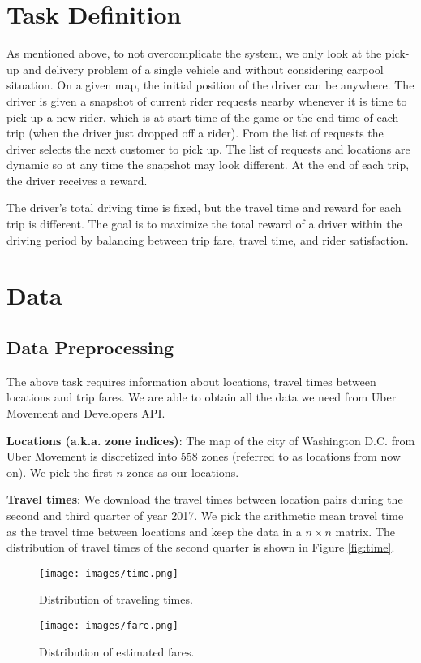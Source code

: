 \documentclass{article}
\begin{document}
\section{Task Definition}

As mentioned above, to not overcomplicate the system, we only look at the pick-up and delivery problem of a single vehicle and without considering carpool situation. On a given map, the initial position of the driver can be anywhere. The driver is given a snapshot of current rider requests nearby whenever it is time to pick up a new rider, which is at start time of the game or the end time of each trip (when the driver just dropped off a rider). From the list of requests the driver selects the next customer to pick up. The list of requests and locations are dynamic so at any time the snapshot may look different. At the end of each trip, the driver receives a reward.

The driver's total driving time is fixed, but the travel time and reward for each trip is different. The goal is to maximize the total reward of a driver within the driving period by balancing between trip fare, travel time, and rider satisfaction.

\section{Data}

\subsection{Data Preprocessing}
The above task requires information about locations, travel times between locations and trip fares. We are able to obtain all the data we need from Uber Movement and Developers API.

\textbf{Locations (a.k.a. zone indices)}: The map of the city of Washington D.C. from Uber Movement is discretized into 558 zones (referred to as locations from now on). We pick the first $n$ zones as our locations.

\textbf{Travel times}: We download the travel times between location pairs during the second and third quarter of year 2017. We pick the arithmetic mean travel time as the travel time between locations and keep the data in a $n\times n$ matrix. The distribution of travel times of the second quarter is shown in Figure \ref{fig:time}.

\begin{figure}[!htb]
\begin{minipage}{0.48\textwidth}
\centering
\texttt{[image: images/time.png]}
\caption{Distribution of traveling times.}
\label{fig:time}
\end{minipage}\hfill
\begin {minipage}{0.48\textwidth}
\centering
\texttt{[image: images/fare.png]}
\caption{Distribution of estimated fares.}
\label{fig:fare}
\end{minipage}
\end{figure}
\end{document}
